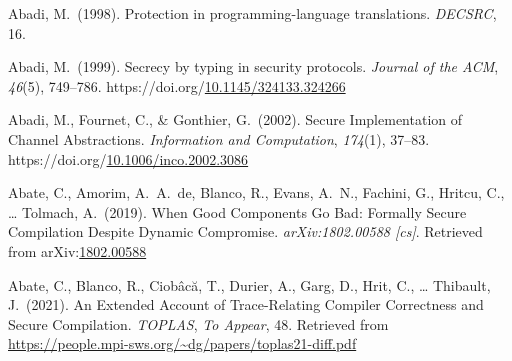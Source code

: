 \documentclass[12pt,twoside]{article}
\begin{document}
{\mdsupressbiblabel{}\begin{thebibliography}{1079}%

\mdbibitemlabel{}Abadi, M.~(1998). Protection in programming-language translations. \emph{DECSRC}, 16.%

\mdbibitemlabel{}Abadi, M.~(1999). Secrecy by typing in security protocols. \emph{Journal of the ACM}, \emph{46}(5), 749–786. https://doi.org/\href{https://dx.doi.org/10.1145/324133.324266}{10.1145/324133.324266}%

\mdbibitemlabel{}Abadi, M., Fournet, C., \& Gonthier, G.~(2002). Secure Implementation of Channel Abstractions. \emph{Information and Computation}, \emph{174}(1), 37–83. https://doi.org/\href{https://dx.doi.org/10.1006/inco.2002.3086}{10.1006/inco.2002.3086}%

\mdbibitemlabel{}Abate, C., Amorim, A.~A.~de, Blanco, R., Evans, A.~N., Fachini, G., Hritcu, C., … Tolmach, A.~(2019). When Good Components Go Bad: Formally Secure Compilation Despite Dynamic Compromise. \emph{arXiv:1802.00588 {}[cs]}. Retrieved from arXiv:\href{http://arxiv.org/abs/1802.00588}{1802.00588}%

\mdbibitemlabel{}Abate, C., Blanco, R., Ciobâcă, T., Durier, A., Garg, D., Hrit, C., … Thibault, J.~(2021). An Extended Account of Trace-Relating Compiler Correctness and Secure Compilation. \emph{TOPLAS}, \emph{To Appear}, 48. Retrieved from \href{https://people.mpi-sws.org/~dg/papers/toplas21-diff.pdf}{{\ttfamily https://\hspace{0pt}people.\hspace{0pt}mpi-\hspace{0pt}sws.\hspace{0pt}org/\hspace{0pt}\textasciitilde{}dg/\hspace{0pt}papers/\hspace{0pt}toplas21-\hspace{0pt}diff.\hspace{0pt}pdf}}%


\end{thebibliography}}
\end{document}
